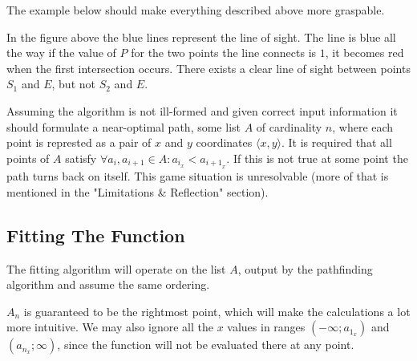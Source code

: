 \documentclass[12pt, titlepage]{article}
\begin{document}
The example below should make everything described above more graspable.

\begin{center}
    
In the figure above the blue lines represent the line of sight. The line
is blue all the way if the value of $P$ for the two points the line connects
is $1$, it becomes red when the first intersection occurs. There exists
a clear line of sight between points $S_1$ and $E$, but not $S_2$ and $E$.
\end{center}

Assuming the algorithm is not ill-formed and given correct input information
it should formulate a near-optimal path, some list $A$ of cardinality $n$, 
where each point is represted as  a pair of $x$ and $y$ coordinates 
$\langle x, y \rangle$. It is required that all points of $A$ satisfy 
$\forall a_i,a_{i+1} \in A : a_{i_x} < a_{{i+1}_x}$. If this is not true 
at some point the path turns back on itself. This game situation is unresolvable 
(more of that is mentioned in the "Limitations \& Reflection" section).

\subsection{Fitting The Function}

The fitting algorithm will operate on the list $A$, output by the 
pathfinding algorithm and assume the same ordering.

$A_n$ is guaranteed to be the rightmost point, which
will make the calculations a lot more intuitive.
We may also ignore all the $x$ values in ranges 
$(-\infty; a_{1_x})$ and $(a_{n_x}; \infty)$, since the function will not be 
evaluated there at any point.
\end{document}
